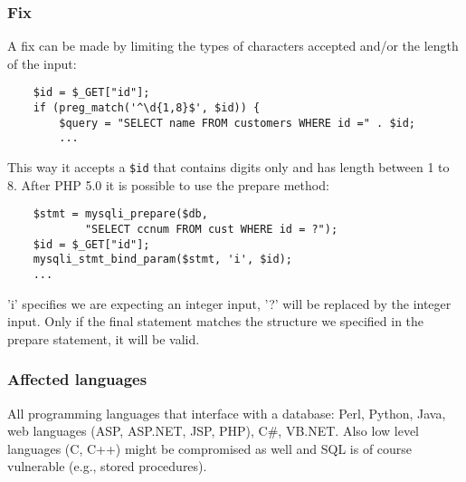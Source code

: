 \documentclass[a4paper, 10pt, titlepage]{article}
\begin{document}
\subsubsection*{Fix}
A fix can be made by limiting the types of characters accepted and/or the length of the input:
\begin{lstlisting}
	$id = $_GET["id"];
	if (preg_match('^\d{1,8}$', $id)) {
		$query = "SELECT name FROM customers WHERE id =" . $id;
		...
\end{lstlisting}
This way it accepts a \lstinline|$id| that contains digits only and has length between 1 to 8. After PHP 5.0 it is possible to use the prepare method:
\begin{lstlisting}
	$stmt = mysqli_prepare($db,
			"SELECT ccnum FROM cust WHERE id = ?");
	$id = $_GET["id"];
	mysqli_stmt_bind_param($stmt, 'i', $id);
	...
\end{lstlisting}
'i' specifies we are expecting an integer input, '?' will be replaced by the integer input. Only if the final statement matches the structure we specified in the prepare statement, it will be valid.

\subsubsection*{Affected languages}
All programming languages that interface with a database: Perl, Python, Java, web languages (ASP, ASP.NET, JSP, PHP), C\#, VB.NET. Also low level languages (C, C++) might be compromised as well and SQL is of course vulnerable (e.g., stored procedures).
\end{document}
